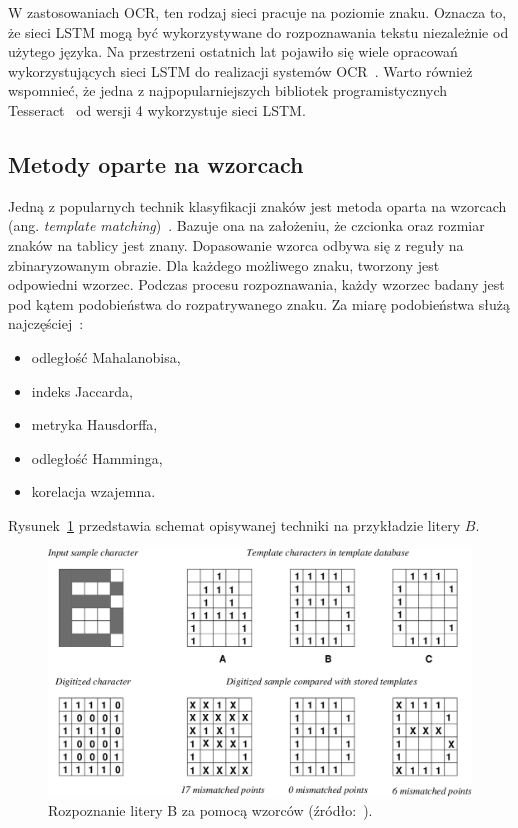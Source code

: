 W zastosowaniach OCR, ten rodzaj sieci pracuje na poziomie znaku.
Oznacza to, że sieci LSTM mogą być wykorzystywane do rozpoznawania tekstu niezależnie od użytego języka.
Na przestrzeni ostatnich lat pojawiło się wiele opracowań wykorzystujących sieci LSTM do realizacji systemów OCR~\cite{10.1109, 8563237}.
Warto również wspomnieć, że jedna z najpopularniejszych bibliotek programistycznych Tesseract~\cite{tesseract} od wersji 4 wykorzystuje sieci LSTM\@.


\subsection{Metody oparte na wzorcach}
Jedną z popularnych technik klasyfikacji znaków jest metoda oparta na wzorcach (ang. \textit{template matching})~\cite{1219663, 1217917}.
Bazuje ona na założeniu, że czcionka oraz rozmiar znaków na tablicy jest znany.
Dopasowanie wzorca odbywa się z reguły na zbinaryzowanym obrazie.
Dla każdego możliwego znaku, tworzony jest odpowiedni wzorzec.
Podczas procesu rozpoznawania, każdy wzorzec badany jest pod kątem podobieństwa do rozpatrywanego znaku.
Za miarę podobieństwa służą najczęściej~\cite{9310202}:
\begin{itemize}
    \item odległość Mahalanobisa,
    \item indeks Jaccarda,
    \item metryka Hausdorffa,
    \item odległość Hamminga,
    \item korelacja wzajemna.
\end{itemize}
Rysunek~\ref{fig:ocr_template_matching} przedstawia schemat opisywanej techniki na przykładzie litery $B$.
\begin{figure}[!ht]
    \centering
    \includegraphics[scale=0.3]{Pictures/ocr_template}
    \caption{Rozpoznanie litery B za pomocą wzorców (źródło:~\cite{Li1993AnIO}).}
    \label{fig:ocr_template_matching}
\end{figure}
